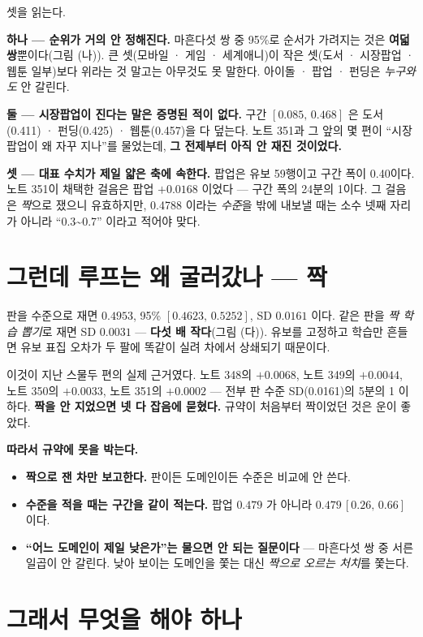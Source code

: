 \documentclass[11pt]{article}
\begin{document}
셋을 읽는다.

\textbf{하나 --- 순위가 거의 안 정해진다.} 마흔다섯 쌍 중 95\%로 순서가
가려지는 것은 \textbf{여덟 쌍}뿐이다(그림 (나)). 큰 셋(모바일 · 게임 ·
세계애니)이 작은 셋(도서 · 시장팝업 · 웹툰 일부)보다 위라는 것 말고는
아무것도 못 말한다. 아이돌 · 팝업 · 펀딩은 \emph{누구와도} 안 갈린다.

\textbf{둘 --- 시장팝업이 진다는 말은 증명된 적이 없다.} 구간
$[0.085,\,0.468]$ 은 도서(0.411) · 펀딩(0.425) · 웹툰(0.457)을 다 덮는다.
노트 351과 그 앞의 몇 편이 ``시장팝업이 왜 자꾸 지나''를 물었는데,
\textbf{그 전제부터 아직 안 재진 것이었다.}

\textbf{셋 --- 대표 수치가 제일 얇은 축에 속한다.} 팝업은 유보 59행이고
구간 폭이 0.40이다. 노트 351이 채택한 걸음은 팝업 $+0.0168$ 이었다 ---
구간 폭의 24분의 1이다. 그 걸음은 \emph{짝}으로 쟀으니 유효하지만,
0.4788 이라는 \emph{수준}을 밖에 내보낼 때는 소수 넷째 자리가 아니라
``0.3\textasciitilde0.7'' 이라고 적어야 맞다.

\section{그런데 루프는 왜 굴러갔나 --- 짝}

판을 수준으로 재면 $0.4953$, 95\% $[0.4623,\,0.5252]$, SD $0.0161$ 이다.
같은 판을 \emph{짝 학습 뽑기}로 재면 SD $0.0031$ --- \textbf{다섯 배
작다}(그림 (다)). 유보를 고정하고 학습만 흔들면 유보 표집 오차가 두 팔에
똑같이 실려 차에서 상쇄되기 때문이다.

이것이 지난 스물두 편의 실제 근거였다. 노트 348의 $+0.0068$, 노트 349의
$+0.0044$, 노트 350의 $+0.0033$, 노트 351의 $+0.0002$ --- 전부 판 수준
SD(0.0161)의 5분의 1 이하다. \textbf{짝을 안 지었으면 넷 다 잡음에
묻혔다.} 규약이 처음부터 짝이었던 것은 운이 좋았다.

\textbf{따라서 규약에 못을 박는다.}
\begin{itemize}
\item \textbf{짝으로 잰 차만 보고한다.} 판이든 도메인이든 수준은
비교에 안 쓴다.
\item \textbf{수준을 적을 때는 구간을 같이 적는다.} 팝업 $0.479$ 가
아니라 $0.479\,[0.26,\,0.66]$ 이다.
\item \textbf{``어느 도메인이 제일 낮은가''는 물으면 안 되는 질문이다}
--- 마흔다섯 쌍 중 서른일곱이 안 갈린다. 낮아 보이는 도메인을 쫓는 대신
\emph{짝으로 오르는 처치}를 쫓는다.
\end{itemize}

\section{그래서 무엇을 해야 하나}
\end{document}
